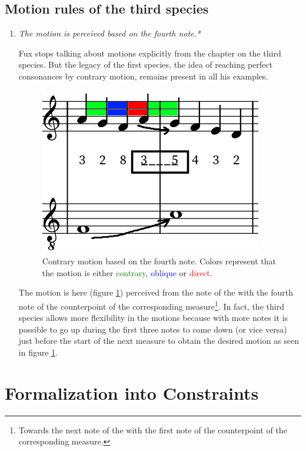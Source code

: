 \subsection{Motion rules of the third species}
\begin{enumerate}[wide, label=\bfseries 3.P\arabic*]
    \item\label{rule:motion3rd} \textit{The motion is perceived based on the fourth note.*}
    
    Fux stops talking about motions explicitly from the chapter on the third species. But the legacy of the first species, the idea of reaching perfect consonances by contrary motion, remains present in all his examples.
    \begin{figure}[h]
        \centering
        \includegraphics[height=\fh]{Images/motion_3rd.png}
        \caption{Contrary motion based on the fourth note. Colors represent that the motion is either \textcolor{green}{contrary}, \textcolor{blue}{oblique} or \textcolor{red}{direct}.}
        \label{fig:motion3rd}
    \end{figure}
    
    The motion is here (figure \ref{fig:motion3rd}) perceived from the note of the \cf with the fourth note of the counterpoint of the corresponding measure\footnote{Towards the next note of the \cf with the first note of the counterpoint of the corresponding measure.}. In fact, the third species allows more flexibility in the motions because with more notes it is possible to go up during the first three notes to come down (or vice versa) just before the start of the next measure to obtain the desired motion as seen in figure \ref{fig:motion3rd}.
\end{enumerate}

\section{Formalization into Constraints}\label{sec:math3sp}

